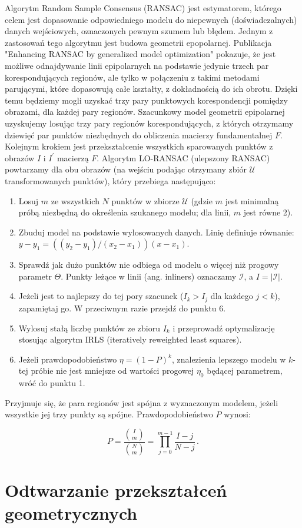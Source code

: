 Algorytm Random Sample Consensus (RANSAC) \cite{ransac} jest estymatorem,
którego celem jest dopasowanie odpowiedniego modelu do niepewnych
(doświadczalnych) danych wejściowych, oznaczonych pewnym szumem lub błędem.
Jednym z zastosowań tego algorytmu jest budowa geometrii epopolarnej.
Publikacja "Enhancing RANSAC by generalized model optimization"
\cite{loransac} pokazuje, że jest możliwe odnajdywanie linii
epipolarnych na podstawie jedynie trzech par korespondujących regionów, ale
tylko w połączeniu z takimi metodami parującymi, które dopasowują całe
kształty, z dokładnością do ich obrotu. Dzięki temu będziemy mogli uzyskać trzy
pary punktowych korespondencji pomiędzy obrazami, dla każdej pary regionów.
Szacunkowy model geometrii epipolarnej uzyskujemy losując trzy pary regionów
korespondujących, z których otrzymamy dziewięć par punktów niezbędnych do
obliczenia macierzy fundamentalnej $F$. Kolejnym krokiem jest przekształcenie
wszystkich sparowanych punktów z obrazów $I$ i $I^\prime$ macierzą $F$.
Algorytm LO-RANSAC \cite{loransac} (ulepszony RANSAC) powtarzamy dla obu
obrazów (na wejściu podając otrzymany zbiór $\mathcal{U}$ transformowanych
punktów), który przebiega następująco: \begin{enumerate} \item Losuj $m$ ze
    wszystkich $N$ punktów w zbiorze $\mathcal{U}$ (gdzie $m$ jest minimalną
    próbą niezbędną do określenia szukanego modelu; dla linii, $m$ jest równe
    2). \item Zbuduj model na podstawie wylosowanych danych. Linię definiuje
    równanie: $y - y_1 = (( y_2 - y_1 ) / ( x_2 - x_1 )) (x - x_1)$.  \item
    Sprawdź jak dużo punktów nie odbiega od modelu o więcej niż progowy
    parametr $\Theta$. Punkty leżące w linii (ang. inliners) oznaczamy
    $\mathcal{I}$, a $I = |\mathcal{I}|$.  \item Jeżeli jest to najlepszy do
    tej pory szacunek ($I_k > I_j$ dla każdego $j < k$), zapamiętaj go. W
    przeciwnym razie przejdź do punktu 6. \item Wylosuj stałą liczbę punktów ze
    zbioru $I_k$ i przeprowadź optymalizację stosując algorytm IRLS
    (iteratively reweighted least squares). \item Jeżeli prawdopodobieństwo
    $\eta = (1-P)^k$, znalezienia lepszego modelu w $k$-tej próbie nie jest
    mniejsze od wartości progowej $\eta_0$ będącej parametrem, wróć do punktu
    1.  \end{enumerate}

Przyjmuje się, że para regionów jest spójna z wyznaczonym modelem, jeżeli
wszystkie jej trzy punkty są spójne. Prawdopodobieństwo $P$ wynosi: 

\begin{equation} P = \frac{{I \choose m}}{{N \choose m}} =
  \prod_{j=0}^{m-1}\frac{I - j}{N-j} \,.  \end{equation}



\section{Odtwarzanie przekształceń geometrycznych}



